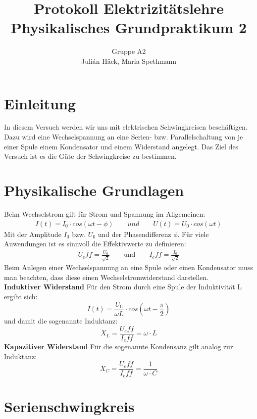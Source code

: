 \documentclass[12pt,a4paper]{article}
\author{Gruppe A2 \\ Julián Häck, Maria Spethmann}
\title{Protokoll Elektrizitätslehre \\ Physikalisches Grundpraktikum 2}
\begin{document}
	\maketitle
	\thispagestyle{empty} %
	\newpage
	\pagestyle{headings} %
	\tableofcontents
	\newpage
\section{Einleitung}
In diesem Versuch werden wir uns mit elektrischen Schwingkreisen beschäftigen. Dazu wird eine Wechselspannung an eine Serien- bzw. Parallelschaltung von je einer Spule einem Kondensator und einem Widerstand angelegt. Das Ziel des Versuch ist es die Güte der Schwingkreise zu bestimmen.
\section{Physikalische Grundlagen}
Beim Wechselstrom gilt für Strom und Spannung im Allgemeinen:
\begin{align}
I(t)=I_0\cdot cos(\omega t - \phi) \qquad und \qquad U(t)=U_0\cdot cos(\omega t)
\end{align}
Mit der Amplitude $I_0$ bzw. $U_0$ und der Phasendifferenz $\phi$.
Für viele Anwendungen ist es sinnvoll die Effektivwerte zu definieren:
\begin{align}
U_eff = \frac{U_0}{\sqrt{2}} \qquad \text{und} \qquad I_eff = \frac{I_0}{\sqrt{2}}
\end{align}
Beim Anlegen einer Wechselspannung an eine Spule oder einen Kondensator muss man beachten, dass diese einen Wechselstromwiderstand darstellen.\\
\textbf{Induktiver Widerstand}
Für den Strom durch eine Spule der Induktivität L ergibt sich:
\begin{equation}
I(t)=\frac{U_0}{\omega L}\cdot cos(\omega t- \frac{\pi}{2})
\end{equation}
und damit die sogenannte Induktanz:
\begin{equation}
X_L=\frac{U_eff}{I_eff}=\omega \cdot L
\end{equation}
\textbf{Kapazitiver Widerstand}
Für die sogenannte Kondensanz gilt analog zur Induktanz:
\begin{equation}
X_C=\frac{U_eff}{I_eff}=\frac{1}{\omega \cdot C}
\end{equation}
\section{Serienschwingkreis}
\end{document}
